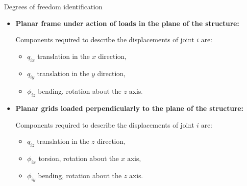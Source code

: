 \documentclass[aspectratio=169]{beamer}
\begin{document}
\begin{frame}{Degrees of freedom identification}
  \vspace{-0.1cm}
  \begin{itemize}
    \item \textbf{Planar frame under action of loads in the plane of the structure:}
          \vspace{-0.1cm}
          \begin{tcolorbox}[colback=darkred!10,colframe=darkred!40!black]
            \small Components required to describe the displacements of joint $i$ are:
            \begin{itemize}
              \item $q_{ix}$ translation in the $x$ direction,
              \item $q_{iy}$ translation in the $y$ direction,
              \item $\phi_{iz}$ bending, rotation about the $z$ axis.
            \end{itemize}
          \end{tcolorbox}
    \item \textbf{Planar grids loaded perpendicularly to the plane of the structure:}
          \vspace{-0.1cm}
          \begin{tcolorbox}[colback=darkred!10,colframe=darkred!40!black]
            \small Components required to describe the displacements of joint $i$ are:
            \begin{itemize}
              \item $q_{iz}$ translation in the $z$ direction,
              \item $\phi_{ix}$  torsion, rotation about the $x$ axis,
              \item $\phi_{iy}$ bending, rotation about the $z$ axis.
            \end{itemize}
          \end{tcolorbox}
  \end{itemize}
\end{frame}
\end{document}
